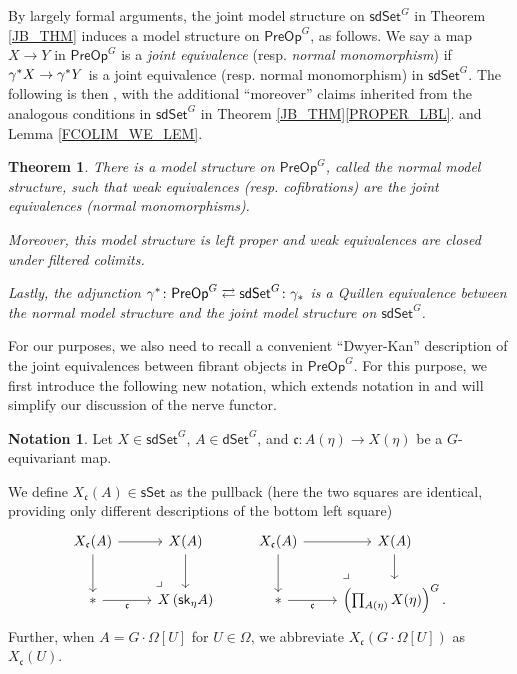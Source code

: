\documentclass[a4paper,10pt
,draft
]{article}%
\numberwithin{equation}{section}
\numberwithin{figure}{section}
\newtheorem{theorem}[equation]{Theorem}%
\theoremstyle{definition} %
\newtheorem{notation}[equation]{Notation}%
\newcommand{\sdSet}{\mathsf{sdSet}}
\newcommand{\PreOp}{\mathsf{PreOp}}
\newcommand{\1}{\ensuremath{\mathbbm 1}}%
\begin{document}
By largely formal arguments, the joint model structure on 
$\mathsf{sdSet}^G$ in Theorem \ref{JB_THM}
induces a model structure on $\mathsf{PreOp}^G$,
as follows.
%
We say a map $X \to Y$ in $\PreOp^G$ is a 
\textit{joint equivalence} (resp. \textit{normal monomorphism}) if
$\gamma^{\**} X \to \gamma^{\**} Y$ is a joint equivalence 
(resp. normal monomorphism) in $\sdSet^G$.
%
The following is then \cite[Thms. 4.39 and 4.42]{BP_edss},
with the additional ``moreover'' claims 
inherited from the 
analogous conditions in $\mathsf{sdSet}^G$ in
Theorem \ref{JB_THM}\ref{PROPER_LBL}.
and Lemma \ref{FCOLIM_WE_LEM}.


\begin{theorem}\label{PREOPMS THM}
	There is a model structure on $\PreOp^G$, called the 
	\emph{normal model structure}, 
	such that weak equivalences (resp. cofibrations) are the joint equivalences (normal monomorphisms).
	
	Moreover, this model structure is left proper
	and weak equivalences are closed under filtered colimits.
	
	Lastly, the adjunction $\gamma^{\**} \colon \PreOp^G \rightleftarrows \sdSet^G \colon \gamma_{\**}$ is a Quillen equivalence
	between the normal model structure and the joint model structure on $\sdSet^G$.
\end{theorem}


For our purposes, we also need to recall
a convenient ``Dwyer-Kan'' description of the joint equivalences
between fibrant objects in $\PreOp^G$.
For this purpose, we first introduce the following new notation,
which extends notation in \cite[Def. 5.7]{BP_edss}
and {\color{blue} will simplify our discussion of the nerve functor}.



\begin{notation}\label{XUDECALT NOT}
	Let $X \in \mathsf{sdSet}^G$, 
	$A \in \mathsf{dSet}^G$,
	and $\mathfrak{c} \colon A(\eta) \to X(\eta)$ 
	be a $G$-equivariant map.
	
	We define $X_{\mathfrak{c}}(A)\in \mathsf{sSet}$
	as the pullback	
	(here the two squares are identical,
	providing only different descriptions of the bottom left square)
\begin{equation}\label{XUDECALT EQ}
\begin{tikzcd}
	X_{\mathfrak{c}}(A) \ar{r} \ar{d}
&
	X(A) \ar{d}
&%
	X_{\mathfrak{c}}(A) \ar{r} \ar{d}
&
	X(A) \ar{d}
\\
	\** \ar{r}[swap]{\mathfrak{c}} 
&
	X \left( \mathsf{sk}_{\eta} A \right)
	\arrow[lu, phantom, "\lrcorner", very near start]
&%
	\** \ar{r}[swap]{\mathfrak{c}} 
&
	\left(\prod_{A(\eta)} X(\eta)\right)^G.
	\arrow[lu, phantom, "\lrcorner", very near start]
\end{tikzcd}
\end{equation}
Further, when $A = G \cdot \Omega[U]$
for $U \in \Omega$,
we abbreviate
$X_{\mathfrak{c}}(G \cdot \Omega[U])$
as 
$X_{\mathfrak{c}}(U)$.
\end{notation}
\end{document}
